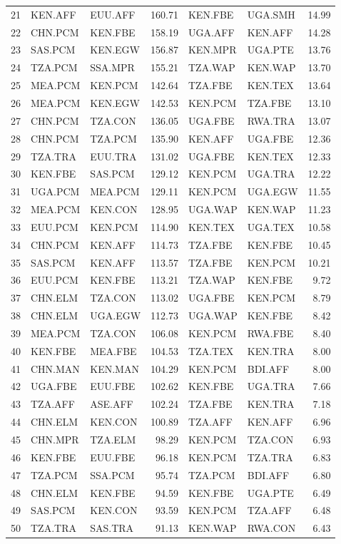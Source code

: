 \documentclass[a4paper]{article}
\begin{document}
\begin{table}[ht]
\begin{tabular}{rllrllr}
  21 & KEN.AFF & EUU.AFF & 160.71 & KEN.FBE & UGA.SMH & 14.99 \\ 
  22 & CHN.PCM & KEN.FBE & 158.19 & UGA.AFF & KEN.AFF & 14.28 \\ 
  23 & SAS.PCM & KEN.EGW & 156.87 & KEN.MPR & UGA.PTE & 13.76 \\ 
  24 & TZA.PCM & SSA.MPR & 155.21 & TZA.WAP & KEN.WAP & 13.70 \\ 
  25 & MEA.PCM & KEN.PCM & 142.64 & TZA.FBE & KEN.TEX & 13.64 \\ 
  26 & MEA.PCM & KEN.EGW & 142.53 & KEN.PCM & TZA.FBE & 13.10 \\ 
  27 & CHN.PCM & TZA.CON & 136.05 & UGA.FBE & RWA.TRA & 13.07 \\ 
  28 & CHN.PCM & TZA.PCM & 135.90 & KEN.AFF & UGA.FBE & 12.36 \\ 
  29 & TZA.TRA & EUU.TRA & 131.02 & UGA.FBE & KEN.TEX & 12.33 \\ 
  30 & KEN.FBE & SAS.PCM & 129.12 & KEN.PCM & UGA.TRA & 12.22 \\ 
  31 & UGA.PCM & MEA.PCM & 129.11 & KEN.PCM & UGA.EGW & 11.55 \\ 
  32 & MEA.PCM & KEN.CON & 128.95 & UGA.WAP & KEN.WAP & 11.23 \\ 
  33 & EUU.PCM & KEN.PCM & 114.90 & KEN.TEX & UGA.TEX & 10.58 \\ 
  34 & CHN.PCM & KEN.AFF & 114.73 & TZA.FBE & KEN.FBE & 10.45 \\ 
  35 & SAS.PCM & KEN.AFF & 113.57 & TZA.FBE & KEN.PCM & 10.21 \\ 
  36 & EUU.PCM & KEN.FBE & 113.21 & TZA.WAP & KEN.FBE & 9.72 \\ 
  37 & CHN.ELM & TZA.CON & 113.02 & UGA.FBE & KEN.PCM & 8.79 \\ 
  38 & CHN.ELM & UGA.EGW & 112.73 & UGA.WAP & KEN.FBE & 8.42 \\ 
  39 & MEA.PCM & TZA.CON & 106.08 & KEN.PCM & RWA.FBE & 8.40 \\ 
  40 & KEN.FBE & MEA.FBE & 104.53 & TZA.TEX & KEN.TRA & 8.00 \\ 
  41 & CHN.MAN & KEN.MAN & 104.29 & KEN.PCM & BDI.AFF & 8.00 \\ 
  42 & UGA.FBE & EUU.FBE & 102.62 & KEN.FBE & UGA.TRA & 7.66 \\ 
  43 & TZA.AFF & ASE.AFF & 102.24 & TZA.FBE & KEN.TRA & 7.18 \\ 
  44 & CHN.ELM & KEN.CON & 100.89 & TZA.AFF & KEN.AFF & 6.96 \\ 
  45 & CHN.MPR & TZA.ELM & 98.29 & KEN.PCM & TZA.CON & 6.93 \\ 
  46 & KEN.FBE & EUU.FBE & 96.18 & KEN.PCM & TZA.TRA & 6.83 \\ 
  47 & TZA.PCM & SSA.PCM & 95.74 & TZA.PCM & BDI.AFF & 6.80 \\ 
  48 & CHN.ELM & KEN.FBE & 94.59 & KEN.FBE & UGA.PTE & 6.49 \\ 
  49 & SAS.PCM & KEN.CON & 93.59 & KEN.PCM & TZA.AFF & 6.48 \\ 
  50 & TZA.TRA & SAS.TRA & 91.13 & KEN.WAP & RWA.CON & 6.43 \\ 
   \bottomrule
\end{tabular}
\end{table}
\end{document}
